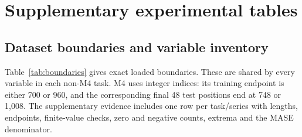 \clearpage
\section{Supplementary experimental tables}\label{sec:inventory}
\subsection{Dataset boundaries and variable inventory}
Table~\ref{tab:boundaries} gives exact loaded boundaries. These are shared by every variable in each non-M4 task. M4 uses integer indices: its training endpoint is either 700 or 960, and the corresponding final 48 test positions end at 748 or 1,008. The supplementary evidence includes one row per task/series with lengths, endpoints, finite-value checks, zero and negative counts, extrema and the MASE denominator.




